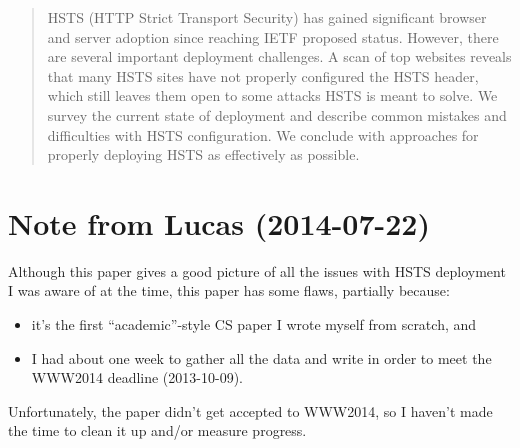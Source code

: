 \documentclass{acm_proc_article-sp}
\begin{document}
\date{October 08, 2013}

\maketitle
\begin{abstract}
HSTS (HTTP Strict Transport Security) has gained significant browser and server adoption since reaching IETF proposed status. However, there are several important deployment challenges. A scan of top websites reveals that many HSTS sites have not properly configured the HSTS header, which still leaves them open to some attacks HSTS is meant to solve. We survey the current state of deployment and describe common mistakes and difficulties with HSTS configuration. We conclude with approaches for properly deploying HSTS as effectively as possible.\end{abstract}





\section{Note from Lucas (2014-07-22)}
\label{sec:note}

Although this paper gives a good picture of all the issues with HSTS deployment I was aware of at the time, this paper has some flaws, partially because:

\begin{itemize}
\item it's the first ``academic''-style CS paper I wrote myself from scratch, and
\item I had about one week to gather all the data and write in order to meet the WWW2014 deadline (2013-10-09).
\end{itemize}

Unfortunately, the paper didn't get accepted to WWW2014, so I haven't made the time to clean it up and/or measure progress.
\end{document}
